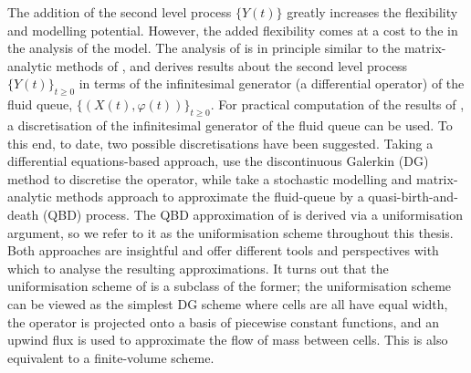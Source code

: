 The addition of the second level process \(\{Y(t)\}\) greatly increases the flexibility and modelling potential. However, the added flexibility comes at a cost to the in the analysis of the model. The analysis of \cite{bo2014} is in principle similar to the matrix-analytic methods of \cite{bean2005}, and derives results about the second level process \(\{Y(t)\}_{t\geq0}\) in terms of the infinitesimal generator (a differential operator) of the fluid queue, \(\{(X(t),\varphi(t))\}_{t\geq0}\). For practical computation of the results of \cite{bo2014}, a discretisation of the infinitesimal generator of the fluid queue can be used. To this end, to date, two possible discretisations have been suggested. Taking a differential equations-based approach, \cite{blnos2022} use the discontinuous Galerkin (DG) method to discretise the operator, while \cite{bo2013} take a stochastic modelling and matrix-analytic methods approach to approximate the fluid-queue by a quasi-birth-and-death (QBD) process. The QBD approximation of \cite{bo2013} is derived via a uniformisation argument, so we refer to it as the uniformisation scheme throughout this thesis. Both approaches are insightful and offer different tools and perspectives with which to analyse the resulting approximations. It turns out that the uniformisation scheme of \cite{bo2013} is a subclass of the former; the uniformisation scheme can be viewed as the simplest DG scheme where cells are all have equal width, the operator is projected onto a basis of piecewise constant functions, and an upwind flux is used to approximate the flow of mass between cells. This is also equivalent to a finite-volume scheme.


